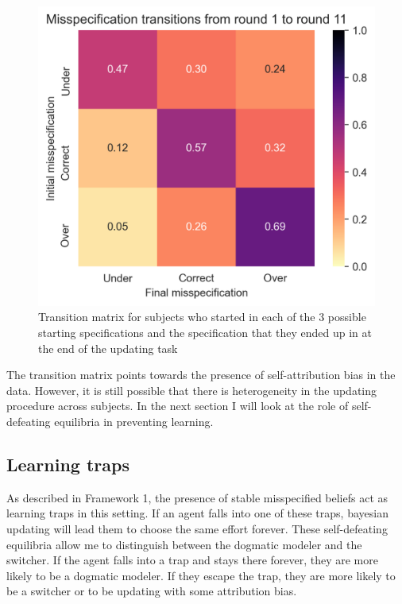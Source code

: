\documentclass[
  12pt,
]{article}
\begin{document}
\begin{figure}
\hypertarget{fig:transitions}{%
\centering
\includegraphics{../figures/misspecification_transitions.png}
\caption{Transition matrix for subjects who started in each of the 3
possible starting specifications and the specification that they ended
up in at the end of the updating task}\label{fig:transitions}
}
\end{figure}

The transition matrix points towards the presence of self-attribution
bias in the data. However, it is still possible that there is
heterogeneity in the updating procedure across subjects. In the next
section I will look at the role of self-defeating equilibria in
preventing learning.

\hypertarget{learning-traps}{%
\subsection{Learning traps}\label{learning-traps}}

As described in Framework 1, the presence of stable misspecified beliefs
act as learning traps in this setting. If an agent falls into one of
these traps, bayesian updating will lead them to choose the same effort
forever. These self-defeating equilibria allow me to distinguish between
the dogmatic modeler and the switcher. If the agent falls into a trap
and stays there forever, they are more likely to be a dogmatic modeler.
If they escape the trap, they are more likely to be a switcher or to be
updating with some attribution bias.
\end{document}
